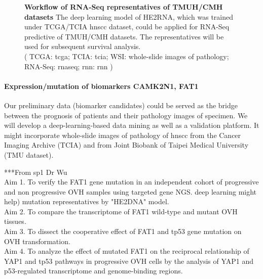 \documentclass[12pt, a4paper]{article}
\newcommand{\bcaption}[2]{\caption{\textbf{#1} #2}}
\begin{document}
\begin{figure}[hp]
\bcaption{Workflow of RNA-Seq representatives of TMUH/CMH datasets}
{The deep learning model of HE2RNA, which was trained under TCGA/TCIA \acrshort{hnscc} dataset, could be applied for RNA-Seq predictive of TMUH/CMH datasets. The representatives will be used for subsequent survival analysis.\\
(
TCGA: \acrlong{tcga};
TCIA: \acrlong{tcia};
WSI: whole-slide images of pathology; 
RNA-Seq: \acrlong{rnaseq}; 
\acrshort{rnn}: \acrlong{rnn}
)
} %
\label{fig:HE2RNA}
\end{figure}

\clearpage



\paragraph{Expression/mutation of biomarkers CAMK2N1, FAT1}


Our preliminary data (biomarker candidates) could be served as the bridge between the prognosis of patients and their pathology images of specimen.
We will develop a deep-learning-based data mining as well as a validation platform. It might incorporate whole-slide images of pathology of \acrshort{hnscc} from the Cancer Imaging Archive (TCIA) and from Joint Biobank of Taipei Medical University (TMU dataset).


***From sp1 Dr Wu\\
Aim 1. To verify the FAT1 gene mutation in an independent cohort of progressive and non progressive OVH samples using targeted gene NGS.
deep learning might help) mutation representatives by "HE2DNA" model.\\
Aim 2. To compare the transcriptome of FAT1 wild-type and mutant OVH tissues. \\
Aim 3. To dissect the cooperative effect of FAT1 and tp53 gene mutation on OVH  transformation. \\
Aim 4. To analyze the effect of mutated FAT1 on the reciprocal relationship of YAP1 and tp53  pathways in progressive OVH cells by the analysis of YAP1 and p53-regulated transcriptome and genome-binding regions.
\end{document}
